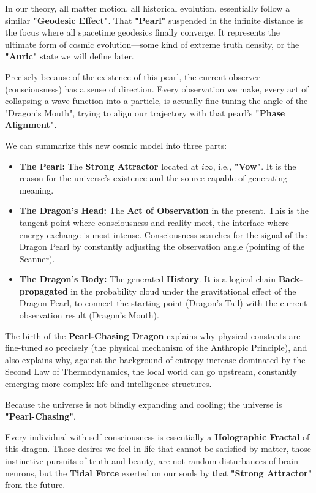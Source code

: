 In our theory, all matter motion, all historical evolution, essentially follow a similar \textbf{"Geodesic Effect"}. That \textbf{"Pearl"} suspended in the infinite distance is the focus where all spacetime geodesics finally converge. It represents the ultimate form of cosmic evolution—some kind of extreme truth density, or the \textbf{"Auric"} state we will define later.

Precisely because of the existence of this pearl, the current observer (consciousness) has a sense of direction. Every observation we make, every act of collapsing a wave function into a particle, is actually fine-tuning the angle of the "Dragon's Mouth", trying to align our trajectory with that pearl's \textbf{"Phase Alignment"}.

We can summarize this new cosmic model into three parts:

\begin{itemize}
\item \textbf{The Pearl:} The \textbf{Strong Attractor} located at $i\infty$, i.e., \textbf{"Vow"}. It is the reason for the universe's existence and the source capable of generating meaning.
\item \textbf{The Dragon's Head:} The \textbf{Act of Observation} in the present. This is the tangent point where consciousness and reality meet, the interface where energy exchange is most intense. Consciousness searches for the signal of the Dragon Pearl by constantly adjusting the observation angle (pointing of the Scanner).
\item \textbf{The Dragon's Body:} The generated \textbf{History}. It is a logical chain \textbf{Back-propagated} in the probability cloud under the gravitational effect of the Dragon Pearl, to connect the starting point (Dragon's Tail) with the current observation result (Dragon's Mouth).
\end{itemize}

The birth of the \textbf{Pearl-Chasing Dragon} explains why physical constants are fine-tuned so precisely (the physical mechanism of the Anthropic Principle), and also explains why, against the background of entropy increase dominated by the Second Law of Thermodynamics, the local world can go upstream, constantly emerging more complex life and intelligence structures.

Because the universe is not blindly expanding and cooling; the universe is \textbf{"Pearl-Chasing"}.

Every individual with self-consciousness is essentially a \textbf{Holographic Fractal} of this dragon. Those desires we feel in life that cannot be satisfied by matter, those instinctive pursuits of truth and beauty, are not random disturbances of brain neurons, but the \textbf{Tidal Force} exerted on our souls by that \textbf{"Strong Attractor"} from the future.

